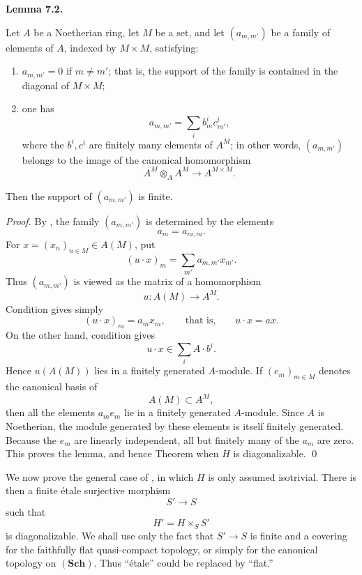 \medskip
\noindent{}\textbf{Lemma 7.2.}
\begin{itshape}
Let \(A\) be a Noetherian ring, let \(M\) be a set, and let
\((a_{m,m'})\) be a family of elements of \(A\), indexed by
\(M\times M\), satisfying:
\begin{enumerate}
  \item[(i)] 
  \(a_{m,m'}=0\) if \(m\neq m'\); that is, the support of the family is
  contained in the diagonal of \(M\times M\);

  \item[(ii)] 
  one has
  \[
    a_{m,m'}=\sum_i b_m^ic_{m'}^i,
  \]
  where the \(b^i,c^i\) are finitely many elements of \(A^M\); in other
  words, \((a_{m,m'})\) belongs to the image of the canonical
  homomorphism
  \[
    A^M\otimes_AA^M\longrightarrow A^{M\times M}.
  \]
\end{enumerate}
Then the support of \((a_{m,m'})\) is finite.
\end{itshape}

\emph{Proof.}
By , the family \((a_{m,m'})\) is determined by the elements
\[
  a_m=a_{m,m}.
\]
For \(x=(x_n)_{n\in M}\in A(M)\), put
\[
  (u\cdot x)_m=\sum_{m'}a_{m,m'}x_{m'}.
\]
Thus \((a_{m,m'})\) is viewed as the matrix of a homomorphism
\[
  u:A(M)\longrightarrow A^M.
\]
Condition  gives simply
\[
  (u\cdot x)_m=a_mx_m,
  \qquad\text{that is,}\qquad
  u\cdot x=ax.
\]
On the other hand, condition  gives
\[
  u\cdot x\in\sum_i A\cdot b^i.
\]
Hence \(u(A(M))\) lies in a finitely generated \(A\)-module. If
\((e_m)_{m\in M}\) denotes the canonical basis of
\[
  A(M)\subset A^M,
\]
then all the elements \(a_me_m\) lie in a finitely generated
\(A\)-module. Since \(A\) is Noetherian, the module generated by these
elements is itself finitely generated. Because the \(e_m\) are linearly
independent, all but finitely many of the \(a_m\) are zero. This proves
the lemma, and hence Theorem  when
\(H\) is diagonalizable. \qed

We now prove the general case of
, in which \(H\) is only assumed
isotrivial. There is then a finite \'etale surjective morphism
\[
  S'\longrightarrow S
\]
such that
\[
  H'=H\times_SS'
\]
is diagonalizable. We shall use only the fact that \(S'\to S\) is finite
and a covering for the faithfully flat quasi-compact topology, or simply
for the canonical topology on \((\mathbf{Sch})\). Thus ``\'etale'' could
be replaced by ``flat.''

